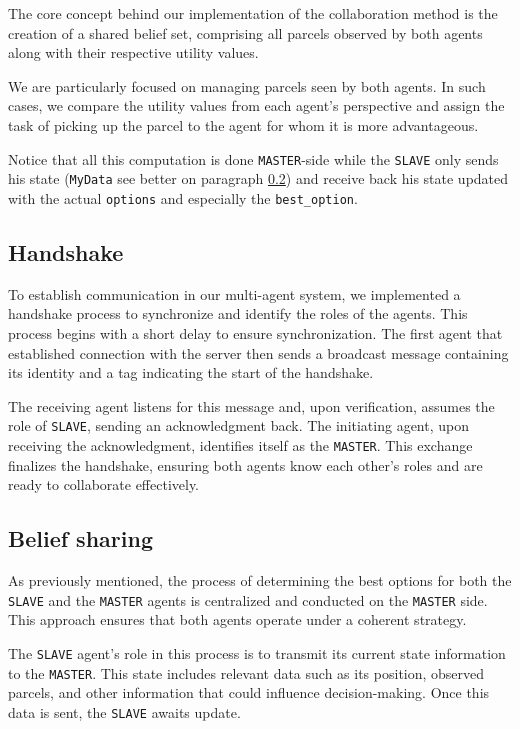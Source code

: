 \documentclass[10pt]{article}
\begin{document}
The core concept behind our implementation of the collaboration method is the creation of a shared belief set, comprising all parcels observed by both agents along with their respective utility values.

We are particularly focused on managing parcels seen by both agents. In such cases, we compare the utility values from each agent's perspective and assign the task of picking up the parcel to the agent for whom it is more advantageous.

Notice that all this computation is done \texttt{MASTER}-side while the \texttt{SLAVE} only sends his state (\texttt{MyData} see better on paragraph \ref{belief}) and receive back his state updated with the actual \texttt{options} and especially the \texttt{best\_option}. 

\subsection{Handshake}

To establish communication in our multi-agent system, we implemented a handshake process to synchronize and identify the roles of the agents. This process begins with a short delay to ensure synchronization. The first agent that established connection with the server then sends a broadcast message containing its identity and a tag indicating the start of the handshake.

The receiving agent listens for this message and, upon verification, assumes the role of \texttt{SLAVE}, sending an acknowledgment back. The initiating agent, upon receiving the acknowledgment, identifies itself as the \texttt{MASTER}. This exchange finalizes the handshake, ensuring both agents know each other's roles and are ready to collaborate effectively. 

\subsection{Belief sharing}
\label{belief}

As previously mentioned, the process of determining the best options for both the \texttt{SLAVE} and the \texttt{MASTER} agents is centralized and conducted on the \texttt{MASTER} side. This approach ensures that both agents operate under a coherent strategy.

The \texttt{SLAVE} agent's role in this process is to transmit its current state information to the \texttt{MASTER}. This state includes relevant data such as its position, observed parcels, and other information that could influence decision-making. Once this data is sent, the \texttt{SLAVE} awaits update.
\end{document}
